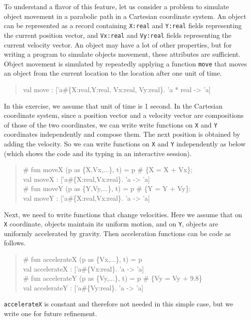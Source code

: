 \documentclass{jbook}
\newenvironment{program}{\begin{tt}\begin{quote}}{\end{quote}\end{tt}}
\begin{document}
	To understand a flavor of this feature, let us consider a
problem to simulate object movement in a parabolic path in a Cartesian
coordinate system.
	An object can be represented as a record containing
{\tt X:real} and {\tt Y:real} fields representing the current
position vector, and {\tt Vx:real} and {\tt Vy:real} fields representing
the current velocity vector.
	An object may have a lot of other properties, but for writing
a program to simulate objects movement, these attributes are sufficient.
	Object movement is simulated by repeatedly applying a function
{\tt move} that moves an object from the current location to the
location after one unit of time.
\begin{program}
val move : ['a\#\{X:real,Y:real, Vx:real, Vy:real\}. 'a * real -> 'a]
\end{program}
	In this exercise, we assume that unit of time is 1 second.
	In the Cartesian coordinate system, since a position vector and
a velocity vector are compositions of those of the two coordinates, 
we can write write functions on {\tt X} and {\tt Y} coordinates
independently and compose them.
	The next position is obtained by adding the velocity.
	So we can write functions on {\tt X} and {\tt Y} independently
as below (which shows the code and its typing in an interactive
session).
\begin{program}
\# fun moveX (p as \{X,Vx,...\}, t) = p \# \{X = X + Vx\};\\
val moveX : ['a\#\{X:real,Vx:real\}. 'a -> 'a]\\
\# fun moveY (p as \{Y,Vy,...\}, t) = p \# \{Y = Y + Vy\};\\
val moveY : ['a\#\{X:real,Vx:real\}. 'a -> 'a]
\end{program}
	Next, we need to write functions that change velocities.
	Here we assume that on {\tt X} coordinate, objects maintain its
uniform motion, and on {\tt Y}, objects are uniformly accelerated by
gravity.
	Then acceleration functions can be code as follows.
\begin{tt}\begin{quote}
\# fun accelerateX (p as \{Vx,...\}, t) = p\\
val accelerateX : ['a\#\{Vx:real\}. 'a -> 'a]\\
\# fun accelerateY (p as \{Vy,...\}, t) = p \# \{Vy = Vy + 9.8\}\\
val accelerateY : ['a\#\{Vy:real\}. 'a -> 'a]\\
\end{quote}\end{tt}
	{\tt accelerateX} is constant and therefore not needed in this
simple case, but we write one for future refinement.
	
\end{document}
